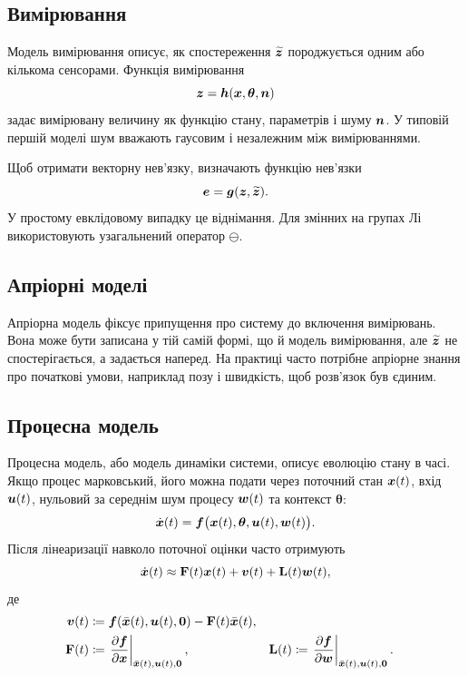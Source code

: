 \subsection{Вимірювання}

Модель вимірювання описує, як спостереження $\widetilde{\bm{z}}$ породжується одним або кількома сенсорами. Функція вимірювання
\begin{equation}
    \bm{z} = \bm{h}(\bm{x},\bm{\theta},\bm{n})
\end{equation}
задає вимірювану величину як функцію стану, параметрів і шуму $\bm{n}$. У типовій першій моделі шум вважають гаусовим і незалежним між вимірюваннями.

Щоб отримати векторну нев'язку, визначають функцію нев'язки
\begin{equation}
    \bm{e} = \bm{g}(\bm{z},\widetilde{\bm{z}}).
\end{equation}
У простому евклідовому випадку це віднімання. Для змінних на групах Лі використовують узагальнений оператор $\ominus$.

\subsection{Апріорні моделі}

Апріорна модель фіксує припущення про систему до включення вимірювань. Вона може бути записана у тій самій формі, що й модель вимірювання, але $\widetilde{\bm{z}}$ не спостерігається, а задається наперед. На практиці часто потрібне апріорне знання про початкові умови, наприклад позу і швидкість, щоб розв'язок був єдиним.

\subsection{Процесна модель}

Процесна модель, або модель динаміки системи, описує еволюцію стану в часі. Якщо процес марковський, його можна подати через поточний стан $\bm{x}(t)$, вхід $\bm{u}(t)$, нульовий за середнім шум процесу $\bm{w}(t)$ та контекст $\bm{\theta}$:
\begin{equation}
    \dot{\bm{x}}(t) = \bm{f}\bigl(\bm{x}(t),\bm{\theta},\bm{u}(t),\bm{w}(t)\bigr).
    \label{eq:state_continuous_nonlinear}
\end{equation}
Після лінеаризації навколо поточної оцінки часто отримують
\begin{equation}
    \dot{\bm{x}}(t) \approx \mathbf{F}(t)\bm{x}(t) + \bm{v}(t) + \mathbf{L}(t)\bm{w}(t),
    \label{eq:state_continuous_linearized}
\end{equation}
де
\begin{align}
    \vect{v}(t) &\coloneqq \vect{f}(\bar{\vect{x}}(t),\vect{u}(t),\vect{0}) - \mat{F}(t)\bar{\vect{x}}(t),\\
    \mat{F}(t) &\coloneqq \left.\frac{\partial \vect{f}}{\partial \vect{x}}\right|_{\bar{\vect{x}}(t),\vect{u}(t),\vect{0}},
    &
    \mat{L}(t) &\coloneqq \left.\frac{\partial \vect{f}}{\partial \vect{w}}\right|_{\bar{\vect{x}}(t),\vect{u}(t),\vect{0}}.
\end{align}

